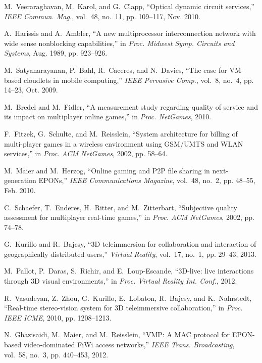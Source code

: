 \documentclass[article]{IEEEtran}
\begin{document}
\begin{thebibliography}{100}
M.~Veeraraghavan, M.~Karol, and G.~Clapp, ``Optical dynamic circuit services,''
  \emph{IEEE Commun. Mag.}, vol.~48, no.~11, pp. 109--117, Nov. 2010.

A.~Harissis and A.~Ambler, ``A new multiprocessor interconnection network with
  wide sense nonblocking capabilities,'' in \emph{Proc. Midwest Symp. Circuits
  and Systems}, Aug. 1989, pp. 923--926.

M.~Satyanarayanan, P.~Bahl, R.~Caceres, and N.~Davies, ``The case for
  {VM}-based cloudlets in mobile computing,'' \emph{IEEE Pervasive Comp.},
  vol.~8, no.~4, pp. 14--23, Oct. 2009.

M.~Bredel and M.~Fidler, ``A measurement study regarding quality of service and
  its impact on multiplayer online games,'' in \emph{Proc. NetGames}, 2010.

F.~Fitzek, G.~Schulte, and M.~Reisslein, ``System architecture for billing of
  multi-player games in a wireless environment using {GSM/UMTS} and {WLAN}
  services,'' in \emph{Proc. ACM NetGames}, 2002, pp. 58--64.

M.~Maier and M.~Herzog, ``Online gaming and {P2P} file sharing in
  next-generation {EPONs},'' \emph{IEEE Communications Magazine}, vol.~48,
  no.~2, pp. 48--55, Feb. 2010.

C.~Schaefer, T.~Enderes, H.~Ritter, and M.~Zitterbart, ``Subjective quality
  assessment for multiplayer real-time games,'' in \emph{Proc. ACM NetGames},
  2002, pp. 74--78.

G.~Kurillo and R.~Bajcsy, ``{3D} teleimmersion for collaboration and
  interaction of geographically distributed users,'' \emph{Virtual Reality},
  vol.~17, no.~1, pp. 29--43, 2013.

M.~Pallot, P.~Daras, S.~Richir, and E.~Loup-Escande, ``{3D}-live: live
  interactions through {3D} visual environments,'' in \emph{Proc. Virtual
  Reality Int. Conf.}, 2012.

R.~Vasudevan, Z.~Zhou, G.~Kurillo, E.~Lobaton, R.~Bajcsy, and K.~Nahrstedt,
  ``Real-time stereo-vision system for {3D} teleimmersive collaboration,'' in
  \emph{Proc. IEEE ICME}, 2010, pp. 1208--1213.

N.~Ghazisaidi, M.~Maier, and M.~Reisslein, ``{VMP}: A {MAC} protocol for
  {EPON}-based video-dominated {FiWi} access networks,'' \emph{IEEE Trans.
  Broadcasting}, vol.~58, no.~3, pp. 440--453, 2012.


\end{thebibliography}
\end{document}
